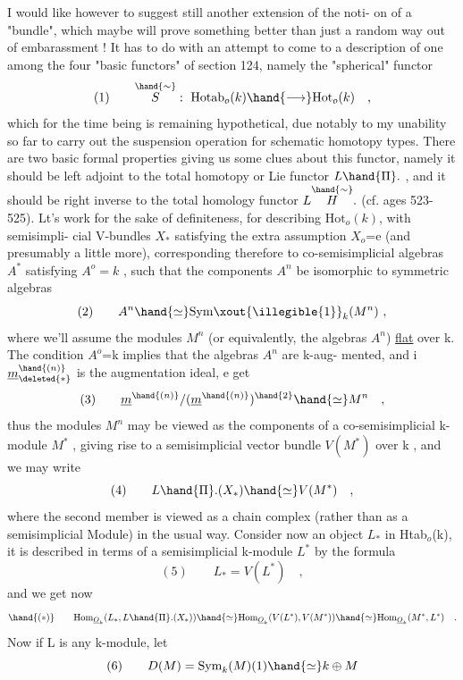 
I would like however to suggest still another extension of the noti-%
on of a "bundle", which maybe will prove something better than just
a random way out of embarassment ! It has to do with an attempt to come
to a description of one among the four "basic functors" of section 124,
namely the "spherical" functor
\[ (1) \qquad \overset{\hand{\sim}}{S} : \ \mathrm{Hotab}_{o}(k) \hand{\longrightarrow} \mathrm{Hot}_{o}(k) \quad , \]
which for the time being is remaining hypothetical, due notably to my
unability so far to carry out the suspension operation for schematic
homotopy types. There are two basic formal properties giving us some
clues about this functor, namely it should be left adjoint to the
total homotopy or Lie functor $L\hand{\Pi}.$ , and it should be right inverse to
the  total homology functor $L\overset{\hand{\sim}}{H}.$ (cf. ages 523-525). Lt's work for
the sake of definiteness,  for describing $\mathrm{Hot}_{o}(k)$, with semisimpli-%
cial V-bundles $X_{*}$ satisfying the extra assumption $X_{o}$=e (and presumably
a little more), corresponding therefore to co-semisimplicial algebras
$A^{*}$ satisfying $A^{o} = k$ , such that the components $A^{n}$ be isomorphic to
symmetric algebras
\[ (2) \qquad A^{n} \hand{\simeq} \mathrm{Sym}\xout{\illegible{1}}_{k}(M^{n}) \ , \]
where we'll assume the modules $M^{n}$ (or equivalently, the algebras $A^{n}$)
\uline{flat} over k. The condition $A^{o}$=k implies that the algebras $A^{n}$ are k-aug-%
mented, and i $\underline{m}^{\hand{(n)}}_{\deleted{*}}$ is the augmentation ideal, e get
\[ (3) \qquad \underline{m}^{\hand{(n)}}/(\underline{m}^{\hand{(n)}})^{\hand{2}} \hand{\simeq} M^{n} \quad , \]
thus the modules $M^{n}$ may be viewed as the components of a co-semisimplicial
k-module $M^{*}$ , giving rise to a semisimplicial vector bundle $V(M^{*})$ over
k , and we may write
\[ (4) \qquad L\hand{\Pi}.(X_{*}) \hand{\simeq} V(M^{*}) \quad , \]
where  the second member is viewed as a chain complex (rather than as a
semisimplicial Module) in the usual way.  Consider now an object
 $L_{*}$ in Htab$_{o}$(k), it is described in terms of a semisimplicial
k-module $L^{*}$ by the formula
\[ (5) \qquad L_{*} = V(L^{*}) \quad , \]
and we get now
\[ \hand{(*)} \qquad \mathrm{Hom}_{\underline{O}_{k}}(L_{*},L\hand{\Pi}.(X_{*})) \hand{\simeq} \mathrm{Hom}_{\underline{O}_{k}}(V(L^{*}),V(M^{*})) \hand{\simeq} \mathrm{Hom}_{\underline{O}_{k}}(M^{*},L^{*}) \quad . \]
Now if L is any k-module, let
\[ (6) \qquad D(M) = \mathrm{Sym}_{k}(M)(1) \hand{\simeq} k \oplus M \]


